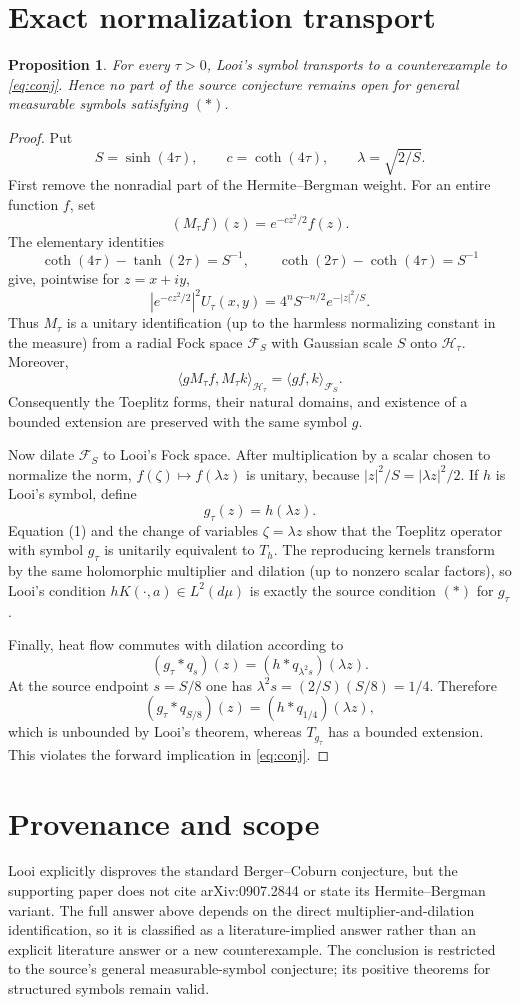 \documentclass[11pt]{article}
\newtheorem{proposition}{Proposition}
\newcommand{\F}{\mathcal F}
\newcommand{\Hh}{\mathcal H}
\begin{document}
\section*{Exact normalization transport}
\begin{proposition}
For every $\tau>0$, Looi's symbol transports to a counterexample to
\eqref{eq:conj}.  Hence no part of the source conjecture remains open for
general measurable symbols satisfying $(*)$.
\end{proposition}

\begin{proof}
Put
\[
 S=\sinh(4\tau),\qquad c=\coth(4\tau),\qquad
 \lambda=\sqrt{2/S}.
\]
First remove the nonradial part of the Hermite--Bergman weight.  For an entire
function $f$, set
\[
 (M_\tau f)(z)=e^{-cz^2/2}f(z).
\]
The elementary identities
\[
 \coth(4\tau)-\tanh(2\tau)=S^{-1},\qquad
 \coth(2\tau)-\coth(4\tau)=S^{-1}
\]
give, pointwise for $z=x+iy$,
\[
 |e^{-cz^2/2}|^2U_\tau(x,y)
 =4^nS^{-n/2}e^{-|z|^2/S}.
\]
Thus $M_\tau$ is a unitary identification (up to the harmless normalizing
constant in the measure) from a radial Fock space $\F_S$ with Gaussian scale
$S$ onto $\Hh_\tau$.  Moreover,
\[
 \langle gM_\tau f,M_\tau k\rangle_{\Hh_\tau}
 =\langle gf,k\rangle_{\F_S}. \tag{1}
\]
Consequently the Toeplitz forms, their natural domains, and existence of a
bounded extension are preserved with the same symbol $g$.

Now dilate $\F_S$ to Looi's Fock space.  After multiplication by a scalar
chosen to normalize the norm, $f(\zeta)\mapsto f(\lambda z)$ is unitary,
because $|z|^2/S=|\lambda z|^2/2$.  If $h$ is Looi's symbol, define
\[
 g_\tau(z)=h(\lambda z).
\]
Equation (1) and the change of variables $\zeta=\lambda z$ show that the
Toeplitz operator with symbol $g_\tau$ is unitarily equivalent to $T_h$.
The reproducing kernels transform by the same holomorphic multiplier and
dilation (up to nonzero scalar factors), so Looi's condition
$hK(\cdot,a)\in L^2(d\mu)$ is exactly the source condition $(*)$ for
$g_\tau$.

Finally, heat flow commutes with dilation according to
\[
 (g_\tau*q_s)(z)=(h*q_{\lambda^2s})(\lambda z).
\]
At the source endpoint $s=S/8$ one has $\lambda^2s=(2/S)(S/8)=1/4$.
Therefore
\[
 (g_\tau*q_{S/8})(z)=(h*q_{1/4})(\lambda z),
\]
which is unbounded by Looi's theorem, whereas $T_{g_\tau}$ has a bounded
extension.  This violates the forward implication in \eqref{eq:conj}.
\end{proof}

\section*{Provenance and scope}
Looi explicitly disproves the standard Berger--Coburn conjecture, but the
supporting paper does not cite arXiv:0907.2844 or state its Hermite--Bergman
variant.  The full answer above depends on the direct multiplier-and-dilation
identification, so it is classified as a literature-implied answer rather
than an explicit literature answer or a new counterexample.  The conclusion
is restricted to the source's general measurable-symbol conjecture; its
positive theorems for structured symbols remain valid.
\end{document}
